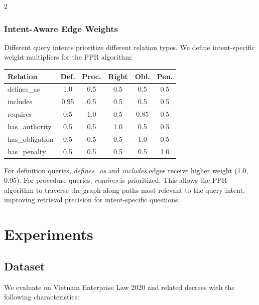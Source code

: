 \documentclass[11pt,a4paper]{article}
\begin{document}
\begin{multicols}{2}

\subsubsection{Intent-Aware Edge Weights}

Different query intents prioritize different relation types. We define intent-specific weight multipliers for the PPR algorithm:

\vspace{0.3em}
\noindent
\centering\small
{}
\label{tab:intent-weights}
\begin{tabular}{l@{\hskip 4pt}c@{\hskip 4pt}c@{\hskip 4pt}c@{\hskip 4pt}c@{\hskip 4pt}c}
\toprule
\textbf{Relation} & \textbf{Def.} & \textbf{Proc.} & \textbf{Right} & \textbf{Obl.} & \textbf{Pen.} \\
\midrule
defines\_as & 1.0 & 0.5 & 0.5 & 0.5 & 0.5 \\
includes & 0.95 & 0.5 & 0.5 & 0.5 & 0.5 \\
requires & 0.5 & 1.0 & 0.5 & 0.85 & 0.5 \\
has\_authority & 0.5 & 0.5 & 1.0 & 0.5 & 0.5 \\
has\_obligation & 0.5 & 0.5 & 0.5 & 1.0 & 0.5 \\
has\_penalty & 0.5 & 0.5 & 0.5 & 0.5 & 1.0 \\
\bottomrule
\end{tabular}
\normalsize
\justifying
\vspace{0.3em}

For definition queries, \textit{defines\_as} and \textit{includes} edges receive higher weight (1.0, 0.95). For procedure queries, \textit{requires} is prioritized. This allows the PPR algorithm to traverse the graph along paths most relevant to the query intent, improving retrieval precision for intent-specific questions.

\section{Experiments}
\label{sec:experiments}

\subsection{Dataset}

We evaluate on Vietnam Enterprise Law 2020 and related decrees with the following characteristics:


\end{multicols}
\end{document}
